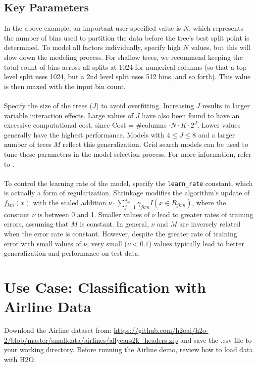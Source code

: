 \subsection{Key Parameters}
\label{ssec:Key parameters}

In the above example, an important user-specified value is $N$, which represents the number of bins used to partition the data before the tree's best split point is determined. To model all factors individually, specify high $N$ values, but this will slow down the modeling process. For shallow trees, we recommend keeping the total count of bins across all splits at 1024  for numerical columns (so that a top-level split uses 1024, but a 2nd level split uses 512 bins, and so forth). This value is then maxed with the input bin count.
\\
\\
Specify the size of the trees ($J$) to avoid overfitting. Increasing $J$ results in larger variable interaction effects. Large values of $J$ have also been found to have an excessive computational cost,
since Cost = \#columns $\cdot N \cdot K \cdot 2^{J}$. Lower values generally have the highest
performance. Models with $4 \leq J \leq 8$ and a larger number of trees $M$ reflect this generalization.
Grid search models can be used to tune these parameters in the model selection process. For more information, refer to . 
\\
\\
To control the learning rate of the model, specify the \texttt{learn\_rate} constant, which is actually a
form of regularization. Shrinkage modifies the algorithm's update of $f_{km}(x)$ with the scaled
addition $\nu \cdot \sum_{j=1}^{J_m} \gamma_{jkm} I(x \in R_{jkm})$, where the constant $\nu$ is between 0 and 1.
Smaller values of $\nu$ lead to greater rates of training errors, assuming that $M$ is constant. In general,
$\nu$ and $M$ are inversely related when the error rate is  constant.
However, despite the greater rate of training error with small values of $\nu$, very small ($\nu < 0.1$) values 
typically lead to better generalization and performance on test data.

\section{Use Case: Classification with Airline Data}

Download the Airline dataset from: {\url{https://github.com/h2oai/h2o-2/blob/master/smalldata/airlines/allyears2k_headers.zip}} and save the .csv file to your working directory. Before running the Airline demo, review how to load data with H2O.

